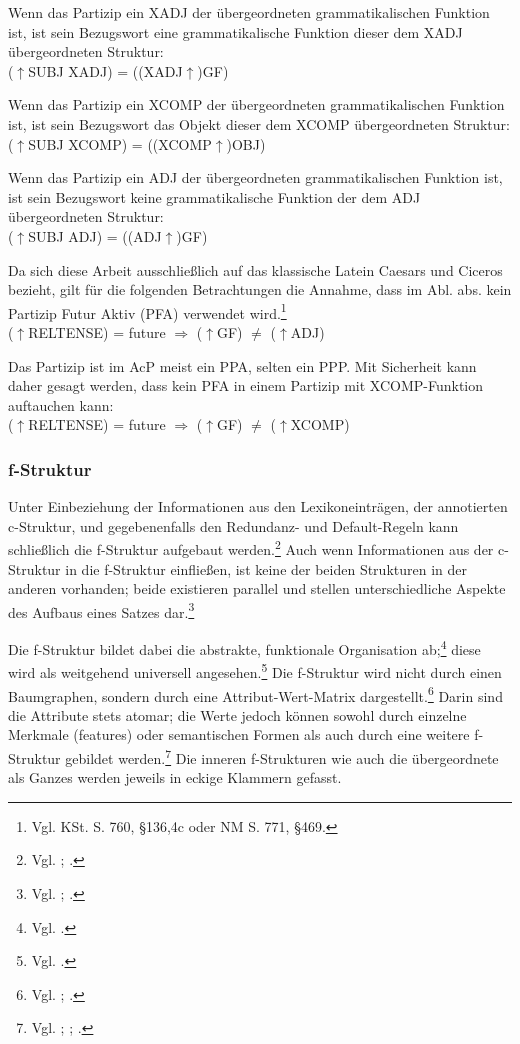 \documentclass[12pt,a4paper]{article}
\begin{document}
Wenn das Partizip ein XADJ der übergeordneten grammatikalischen Funktion ist, ist sein Bezugswort eine grammatikalische Funktion dieser dem XADJ übergeordneten Struktur: \\
($\uparrow$SUBJ XADJ) = ((XADJ$\uparrow$)GF)

Wenn das Partizip ein XCOMP der übergeordneten grammatikalischen Funktion ist, ist sein Bezugswort das Objekt dieser dem XCOMP übergeordneten Struktur: \\
($\uparrow$SUBJ XCOMP) = ((XCOMP$\uparrow$)OBJ) 

Wenn das Partizip ein ADJ der übergeordneten grammatikalischen Funktion ist, ist sein Bezugswort keine grammatikalische Funktion der dem ADJ übergeordneten Struktur: \\
($\uparrow$SUBJ ADJ) = ((ADJ$\uparrow$)GF)

Da sich diese Arbeit ausschließlich auf das klassische Latein Caesars und Ciceros bezieht, gilt für die folgenden Betrachtungen die Annahme, dass im Abl. abs. kein Partizip Futur Aktiv (PFA) verwendet wird.\footnote{Vgl. KSt. S. 760, §136,4c oder NM S. 771, §469.}\\
($\uparrow$RELTENSE) = future $\Rightarrow$ ($\uparrow$GF) $\neq$ ($\uparrow$ADJ)

Das Partizip ist im AcP meist ein PPA, selten ein PPP. Mit Sicherheit kann daher gesagt werden, dass kein PFA in einem Partizip mit XCOMP-Funktion auftauchen kann: \\
($\uparrow$RELTENSE) = future $\Rightarrow$ ($\uparrow$GF) $\neq$ ($\uparrow$XCOMP)

\subsubsection{f-Struktur}
Unter Einbeziehung der Informationen aus den Lexikoneinträgen, der annotierten c-Struktur, und gegebenenfalls den Redundanz- und Default-Regeln kann schließlich die f-Struktur aufgebaut werden.\footnote{Vgl. \cite[13; 23]{Rohrer}; \cite[14]{Skript}.} Auch wenn Informationen aus der c-Struktur in die f-Struktur einfließen, ist keine der beiden Strukturen in der anderen vorhanden; beide existieren parallel und stellen unterschiedliche Aspekte des Aufbaus eines Satzes dar.\footnote{Vgl. \cite[26-7; 35]{Rohrer}; \cite[8]{Skript}.}

Die f-Struktur bildet dabei die abstrakte, funktionale Organisation ab;\footnote{Vgl. \cite[7]{Dal}.} diese wird als weitgehend universell angesehen.\footnote{Vgl. \cite[7; 9]{Bresnan}.} Die f-Struktur wird nicht durch einen Baumgraphen, sondern durch eine Attribut-Wert-Matrix dargestellt.\footnote{Vgl. \cite[55]{Falk}; \cite[7]{Skript}.} Darin sind die Attribute stets atomar; die Werte jedoch können sowohl durch einzelne Merkmale (features) oder semantischen Formen als auch durch eine weitere f-Struktur gebildet werden.\footnote{Vgl. \cite[55]{Falk}; \cite[13]{Rohrer}; \cite[8]{Skript}.} Die inneren f-Strukturen wie auch die übergeordnete als Ganzes werden jeweils in eckige Klammern gefasst.
\end{document}
